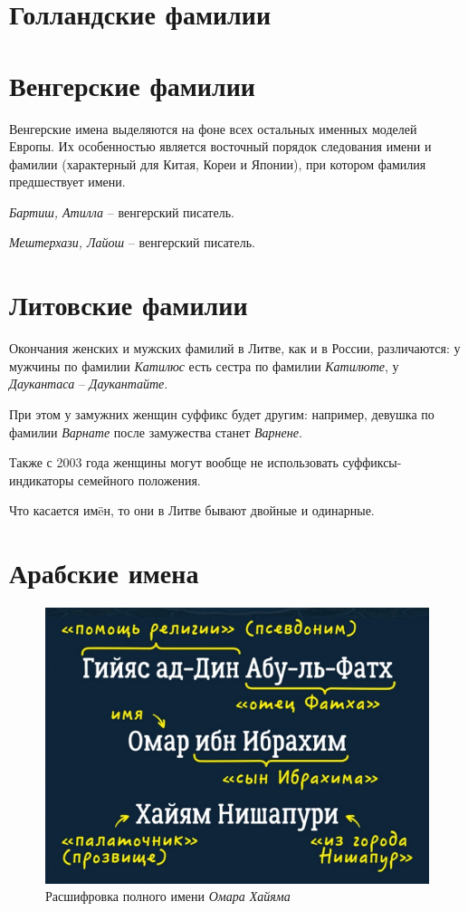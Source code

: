 \section{Голландские фамилии}

\section{Венгерские фамилии}

Венгерские имена выделяются на фоне всех остальных именных моделей Европы. Их особенностью является восточный порядок следования имени и фамилии (характерный для Китая, Кореи и Японии), при котором фамилия предшествует имени. 

\emph{Бартиш, Атилла} -- венгерский писатель.

\emph{Мештерхази, Лайош} -- венгерский писатель.

\section{Литовские фамилии}

Окончания женских и мужских фамилий в Литве, как и в России, различаются: у мужчины по фамилии \emph{Катилюс} есть сестра по фамилии \emph{Катилюте}, у \emph{Даукантаса} -- \emph{Даукантайте}.

При этом у замужних женщин суффикс будет другим: например, девушка по фамилии \emph{Варнате} после замужества станет \emph{Варнене}.

Также с 2003 года женщины могут вообще не использовать суффиксы-индикаторы семейного положения.

Что касается им\"eн, то они в Литве бывают двойные и одинарные.

\section{Арабские имена}

\begin{figure}
    \centering
    \includegraphics[width=0.7\linewidth]{img/haiyam}
    \caption{Расшифровка полного имени \emph{Омара Хайяма}}
    \label{fig:haiyam}
\end{figure}

